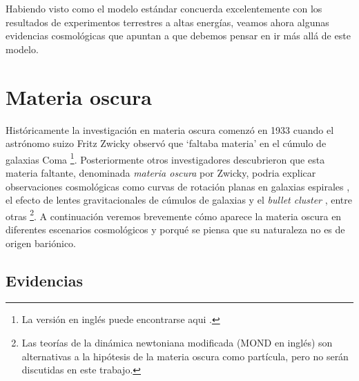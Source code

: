 
Habiendo visto como el modelo estándar concuerda excelentemente con los resultados de experimentos terrestres a altas energías, veamos ahora algunas evidencias cosmológicas que apuntan a que debemos pensar en ir más allá de este modelo.



\section[\hspace{-0.14in}Materia oscura]{Materia oscura}

Históricamente la investigación en materia oscura comenzó en 1933 cuando el astrónomo suizo Fritz Zwicky observó que `faltaba materia' en el cúmulo de galaxias Coma \cite{zwicky}\footnote{La versión en inglés puede encontrarse aqui \cite{zwicky2009republication}.}. Posteriormente otros investigadores descubrieron que esta materia faltante, denominada \textit{materia oscura} por Zwicky, podria explicar observaciones cosmológicas como curvas de rotación planas en galaxias espirales \cite{Vera,rubin1978extended}, el efecto de lentes gravitacionales de cúmulos de galaxias y el \textit{bullet cluster} \cite{clowe2006direct}, entre otras \footnote{Las teorías de la dinámica newtoniana modificada (MOND en inglés) son alternativas a la hipótesis de la materia oscura como partícula, pero no serán discutidas en este trabajo.}. A continuación veremos brevemente cómo aparece la materia oscura en diferentes escenarios cosmológicos y porqué se piensa que su naturaleza no es de origen bariónico.


\subsection[\hspace{-0.4in}) Evidencias]{Evidencias}




